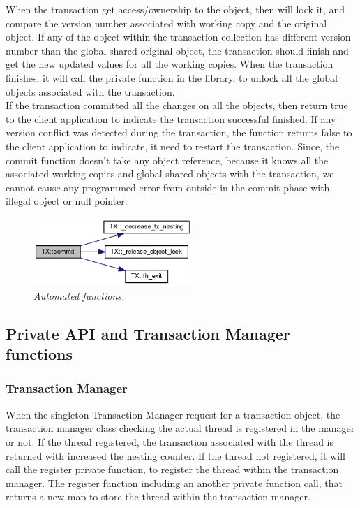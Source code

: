 \documentclass[12pt]{article}
\begin{document}
When the transaction get access/ownership to the object, then will lock it, and compare the version number associated with working copy and the original object. If any of the object within the transaction collection has different version number than the global shared original object, the transaction should finish and get the new updated values for all the working copies. When the transaction finishes, it will call the private function in the library, to unlock all the global objects associated with the transaction.\\

If the transaction committed all the changes on all the objects, then return true to the client application to indicate the transaction successful finished. If any version conflict was detected during the transaction, the function  returns false to the client application to indicate, it need to restart the transaction. Since, the commit function doesn't take any object reference, because it knows all the associated working copies and global shared objects with the transaction, we cannot cause any programmed error from outside in the commit phase with illegal object or null pointer.

\begin{figure}[h!]
\centering
\includegraphics[width=6cm]{Pictures/commit.png}
\caption*{\textit{\color{gray}Automated functions.}}
\end{figure}

\subsection{Private API and Transaction Manager functions}
\subsubsection{Transaction Manager}
When the singleton Transaction Manager request for a transaction object, the transaction manager class checking the actual thread is registered in the manager or not. If the thread registered, the transaction associated with the thread is returned with increased the nesting counter. If the thread not registered, it will call the register private function, to register the thread within the transaction manager. The register function including an another private function call, that returns a new map to store the thread within the transaction manager.
\end{document}
